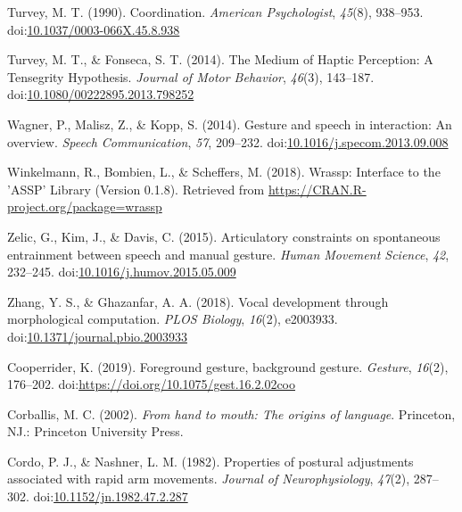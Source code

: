 \documentclass[
  man,floatsintext]{apa6}
\newlength{\cslhangindent}
\newenvironment{cslreferences}%
  {\setlength{\parindent}{0pt}%
  \everypar{\setlength{\hangindent}{\cslhangindent}}\ignorespaces}%
  {\par}
\begin{document}
\begin{cslreferences}
\leavevmode\hypertarget{ref-turveyCoordination1990}{}%
Turvey, M. T. (1990). Coordination. \emph{American Psychologist}, \emph{45}(8), 938--953. doi:\href{https://doi.org/10.1037/0003-066X.45.8.938}{10.1037/0003-066X.45.8.938}

\leavevmode\hypertarget{ref-turveyMediumHapticPerception2014}{}%
Turvey, M. T., \& Fonseca, S. T. (2014). The Medium of Haptic Perception: A Tensegrity Hypothesis. \emph{Journal of Motor Behavior}, \emph{46}(3), 143--187. doi:\href{https://doi.org/10.1080/00222895.2013.798252}{10.1080/00222895.2013.798252}

\leavevmode\hypertarget{ref-wagnerGestureSpeechInteraction2014}{}%
Wagner, P., Malisz, Z., \& Kopp, S. (2014). Gesture and speech in interaction: An overview. \emph{Speech Communication}, \emph{57}, 209--232. doi:\href{https://doi.org/10.1016/j.specom.2013.09.008}{10.1016/j.specom.2013.09.008}

\leavevmode\hypertarget{ref-winkelmannWrasspInterfaceASSP2018}{}%
Winkelmann, R., Bombien, L., \& Scheffers, M. (2018). Wrassp: Interface to the 'ASSP' Library (Version 0.1.8). Retrieved from \url{https://CRAN.R-project.org/package=wrassp}

\leavevmode\hypertarget{ref-zelicArticulatoryConstraintsSpontaneous2015}{}%
Zelic, G., Kim, J., \& Davis, C. (2015). Articulatory constraints on spontaneous entrainment between speech and manual gesture. \emph{Human Movement Science}, \emph{42}, 232--245. doi:\href{https://doi.org/10.1016/j.humov.2015.05.009}{10.1016/j.humov.2015.05.009}

\leavevmode\hypertarget{ref-zhangVocalDevelopmentMorphological2018}{}%
Zhang, Y. S., \& Ghazanfar, A. A. (2018). Vocal development through morphological computation. \emph{PLOS Biology}, \emph{16}(2), e2003933. doi:\href{https://doi.org/10.1371/journal.pbio.2003933}{10.1371/journal.pbio.2003933}

\leavevmode\hypertarget{ref-cooperriderForegroundGestureBackground2019}{}%
Cooperrider, K. (2019). Foreground gesture, background gesture. \emph{Gesture}, \emph{16}(2), 176--202. doi:\href{https://doi.org/https://doi.org/10.1075/gest.16.2.02coo}{https://doi.org/10.1075/gest.16.2.02coo}

\leavevmode\hypertarget{ref-corballisHandMouthOrigins2002}{}%
Corballis, M. C. (2002). \emph{From hand to mouth: The origins of language}. Princeton, NJ.: Princeton University Press.

\leavevmode\hypertarget{ref-cordoPropertiesPosturalAdjustments1982}{}%
Cordo, P. J., \& Nashner, L. M. (1982). Properties of postural adjustments associated with rapid arm movements. \emph{Journal of Neurophysiology}, \emph{47}(2), 287--302. doi:\href{https://doi.org/10.1152/jn.1982.47.2.287}{10.1152/jn.1982.47.2.287}


\end{cslreferences}
\end{document}

